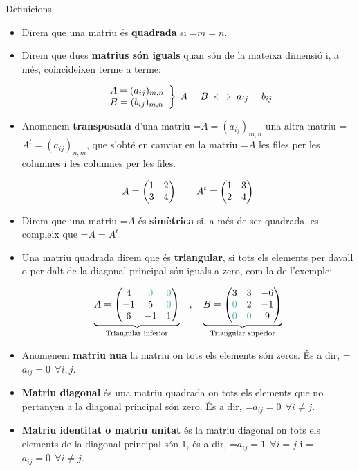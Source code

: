 \documentclass[11pt,a4paper]{article}
\newcommand{\fmm}[1]{\setbox0=\hbox{$#1$}\ifdim\wd0>\linewidth\fmdisp{#1}\else\mbox{\box0}\fi}
\newcommand{\fmdisp}[1]{\[\setbox2=\hbox{$\displaystyle #1$}\ifdim\wd2>\linewidth\resizebox{\linewidth}{!}{\box2}\else\box2\fi\]}
\begin{document}
\begin{fmdef}{Definicions}
\begin{itemize}
\item Direm que una matriu és \textbf{quadrada} si \fmm{m=n}.
\item Direm que dues \textbf{matrius són iguals} quan són de la mateixa dimensió i, a més, coincideixen terme a terme:

\fmdisp{\left.\begin{array}{l} A=(a_{ij})_{m,n}\\ B=(b_{ij})_{m,n}\end{array}\right\}\; A=B \iff a_{ij}=b_{ij}}

\item Anomenem \textbf{transposada} d'una matriu \fmm{A=(a_{ij})_{m,n}} una altra matriu \fmm{A^t=(a_{ij})_{n,m}}, que s'obté en canviar en la matriu \fmm{A} les files per les columnes i les columnes per les files.

\fmdisp{A=\begin{pmatrix}1 & 2\\ 3 & 4\end{pmatrix}\qquad A^t=\begin{pmatrix}1 & 3\\ 2 & 4\end{pmatrix}}

\item Direm que una matriu \fmm{A} és \textbf{simètrica} si, a més de ser quadrada, es compleix que \fmm{A=A^t}.
\item Una matriu quadrada direm que és \textbf{triangular}, si tots els elements per davall o per dalt de la diagonal principal són iguals a zero, com la de l'exemple:

\fmdisp{\underbrace{A=\begin{pmatrix}4 & \color[HTML]{2bb3a3}0 & \color[HTML]{2bb3a3}0\\ -1 & 5 & \color[HTML]{2bb3a3}0\\ 6 & -1 & 1\end{pmatrix}}_{\text{Triangular inferior}}\quad,\quad \underbrace{B=\begin{pmatrix}3 & 3 & -6\\ \color[HTML]{2bb3a3}0 & 2 & -1\\ \color[HTML]{2bb3a3}0 & \color[HTML]{2bb3a3}0 & 9\end{pmatrix}}_{\text{Triangular superior}}}

\item Anomenem \textbf{matriu nu\lgem{}a} la matriu on tots els elements són zeros. És a dir, \fmm{a_{ij}=0\ \ \forall i,j}.
\item \textbf{Matriu diagonal} és una matriu quadrada on tots els elements que no pertanyen a la diagonal principal són zero. És a dir, \fmm{a_{ij}=0\ \ \forall i\neq j}.
\item \textbf{Matriu identitat o matriu unitat} és la matriu diagonal on tots els elements de la diagonal principal són 1, és a dir, \fmm{a_{ij}=1\ \ \forall i=j} i \fmm{a_{ij}=0\ \ \forall i\neq j}.
\end{itemize}
\end{fmdef}
\end{document}
